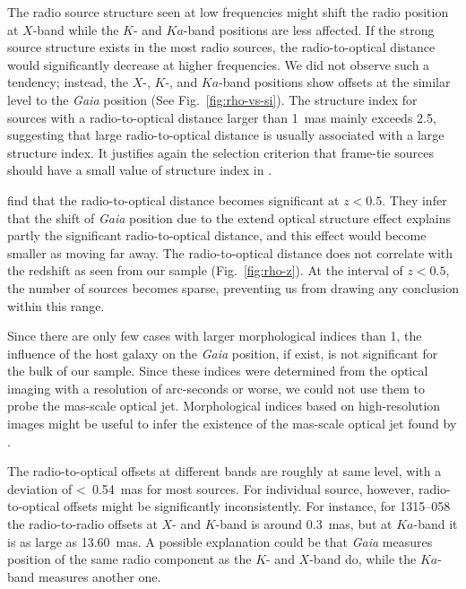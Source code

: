 \documentclass{aa}
\begin{document}
    The radio source structure seen at low frequencies might shift the radio position at $X$-band while the $K$- and $Ka$-band positions are less affected.
    If the strong source structure exists in the most radio sources, the radio-to-optical distance would significantly decrease at higher frequencies.
    We did not observe such a tendency;
    instead, the $X$-, $K$-, and $Ka$-band positions show offsets at the similar level to the \textit{Gaia} position (See Fig.~\ref{fig:rho-vs-si}).
    The structure index for sources with a radio-to-optical distance larger than 1~mas mainly exceeds 2.5, suggesting that large radio-to-optical distance is usually associated with a large structure index.
    It justifies again the selection criterion that frame-tie sources should have a small value of structure index in \citet{2008A&A...490..403B}.

    \citet{2017ApJ...835L..30M} find that the radio-to-optical distance becomes significant at $z<0.5$.
    They infer that the shift of \textit{Gaia} position due to the extend optical structure effect explains partly the significant radio-to-optical distance, and this effect would become smaller as moving far away.
    The radio-to-optical distance does not correlate with the redshift as seen from our sample (Fig.~\ref{fig:rho-z}).
    At the interval of $z<0.5$, the number of sources becomes sparse, preventing us from drawing any conclusion within this range.

    Since there are only few cases with larger morphological indices than 1, the influence of the host galaxy on the \textit{Gaia} position, if exist, is not significant for the bulk of our sample.
    Since these indices were determined from the optical imaging with a resolution of arc-seconds or worse, we could not use them to probe the mas-scale optical jet.
    Morphological indices based on high-resolution images might be useful to infer the existence of the mas-scale optical jet found by \citet{2017MNRAS.467L..71P}.

    The radio-to-optical offsets at different bands are roughly at same level, with a deviation of <~0.54~mas for most sources.
    For individual source, however, radio-to-optical offsets might be significantly inconsistently.
    For instance, for 1315--058 the radio-to-radio offsets at $X$- and $K$-band is around 0.3~mas, but at $Ka$-band it is as large as 13.60~mas.
    A possible explanation could be that \textit{Gaia} measures position of the same radio component as the $K$- and $X$-band do, while the $Ka$-band measures another one.
\end{document}
